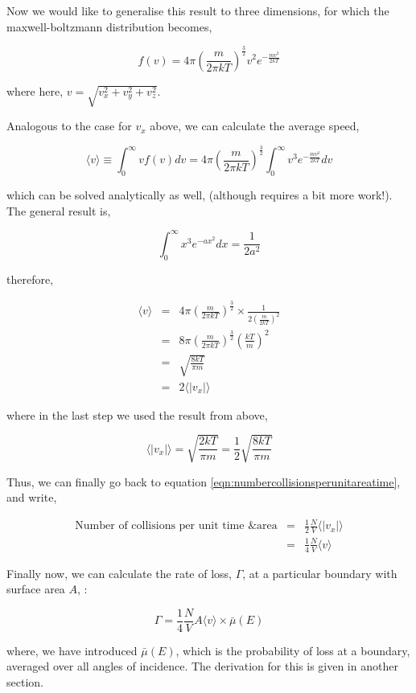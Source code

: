\documentclass[11pt,a4paper,oneside]{article}
\begin{document}
Now we would like to generalise this result to three dimensions, for which the maxwell-boltzmann distribution becomes, 

\begin{equation}
f(v) = 4\pi \left(\frac{m}{2\pi k T}\right)^{\frac{3}{2}} v^{2} e^{-\frac{mv^{2}}{2kT}}
\end{equation}

where here, $v = \sqrt{v_{x}^{2} + v_{y}^{2} + v_{z}^{2}}$.

Analogous to the case for $v_{x}$ above, we can calculate the average speed, 

\begin{equation}
\langle v \rangle \equiv \int_{0}^{\infty} vf(v) dv =  4\pi \left(\frac{m}{2\pi k T}\right)^{\frac{3}{2}} \int_{0}^{\infty} v^{3} e^{-\frac{mv^{2}}{2kT}} dv
\end{equation}

which can be solved analytically as well, (although requires a bit more work!). The general result is, 

\begin{equation}
\int_{0}^{\infty} x^{3} e^{-ax^{2}} dx = \frac{1}{2a^{2}}
\end{equation}

therefore, 

\begin{eqnarray*}
\langle v \rangle &=& 4\pi \left(\frac{m}{2\pi k T}\right)^{\frac{3}{2}} \times \frac{1}{2(\frac{m}{2kT})^{2}} \\
&=& 8\pi \left(\frac{m}{2\pi k T}\right)^{\frac{3}{2}}\left( \frac{kT}{m} \right)^{2} \\
&=& \sqrt{\frac{8kT}{\pi m}} \\
&=& 2 \langle |v_{x}| \rangle 
\end{eqnarray*}

where in the last step we used the result from above, 

\begin{equation}
\langle |v_{x}| \rangle = \sqrt{\frac{2kT}{\pi m}} = \frac{1}{2}\sqrt{\frac{8kT}{\pi m}}
\end{equation}

Thus, we can finally go back to equation \ref{eqn:numbercollisionsperunitareatime}, and write, 

\begin{eqnarray*}
\mbox{Number of collisions per unit time \& area} &=& \frac{1}{2}\frac{N}{V} \langle |v_{x}| \rangle \\
&=& \frac{1}{4}\frac{N}{V}\langle v \rangle
\end{eqnarray*}

Finally now, we can calculate the rate of loss, $\Gamma$, at a particular boundary with surface area $A$, :

\begin{equation}
\Gamma = \frac{1}{4}\frac{N}{V}A\langle v \rangle \times \bar{\mu}(E)
\end{equation}

where, we have introduced $\bar{\mu}(E)$, which is the probability of loss at a boundary, averaged over all angles of incidence. The derivation for this is given in another section. 
\end{document}
